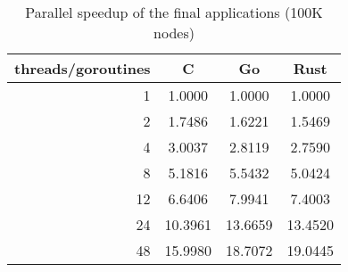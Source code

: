 \begin{table}[htb]
    \centering
    \begin{tabular}{rccc}
        \toprule
            threads/goroutines
            & C
            & Go
            & Rust \\
        \midrule

            1
            & \hspace{6pt}1.0000
            & \hspace{6pt}1.0000
            & \hspace{6pt}1.0000 \\

            2
            & \hspace{6pt}1.7486
            & \hspace{6pt}1.6221
            & \hspace{6pt}1.5469 \\

            4
            & \hspace{6pt}3.0037
            & \hspace{6pt}2.8119
            & \hspace{6pt}2.7590 \\

            8
            & \hspace{6pt}5.1816
            & \hspace{6pt}5.5432
            & \hspace{6pt}5.0424 \\

            12
            & \hspace{6pt}6.6406
            & \hspace{6pt}7.9941
            & \hspace{6pt}7.4003 \\

            24
            & 10.3961
            & 13.6659
            & 13.4520 \\

            48
            & 15.9980
            & 18.7072
            & 19.0445 \\

        \bottomrule
    \end{tabular}
    \caption{Parallel speedup of the final applications (100K nodes)}
    \label{tb:final_speedup}
\end{table}

